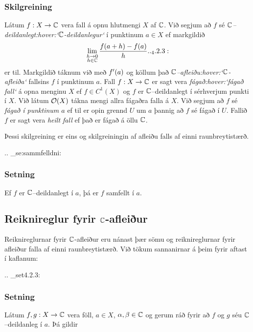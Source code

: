 \subsubsection{Skilgreining}
Látum $f:X\to {\mathbb C}$ vera fall á opnu hlutmengi $X$ af ${\mathbb C}$.  
Við segjum
að $f$ sé {\it ${\mathbb C}$--deildanlegt:hover:`${\mathbb C}$-deildanlegur`} í punktinum $a\in X$ ef markgildið
 \begin{equation*}\lim _{\substack{ h\to 0\\ h\in\C}}
 \dfrac{f(a+h)-f(a)}h  

.. _4.2.3:

 \end{equation*}
er til.  Markgildið táknum við með $f{\sp{\prime}}(a)$ og köllum það
{\it ${\mathbb C}$--afleiðu:hover:`${\mathbb C}$-afleiða`} fallsins $f$ í punktinum $a$.  
Fall $f:X\to {\mathbb C}$ er sagt vera {\it fágað:hover:`fágað fall`} á opna menginu $X$ ef $f\in
C^1(X)$ og $f$ er ${\mathbb C}$--deildanlegt í sérhverjum punkti í $X$.  Við
látum ${\cal O}(X)$ tákna mengi allra fágaðra falla á $X$.  Við segjum að
$f$ sé {\it fágað í punktinum $a$} ef til er opin grennd $U$ um $a$ þannig
að $f$ sé fágað í $U$.  Fallið $f$ er sagt vera {\it heilt fall} ef
það er fágað á  öllu ${\mathbb C}$.



Þessi skilgreining er eins og skilgreiningin af afleiðu falls af einni
raun\-breyti\-stærð.  



.. _se:sammfelldni:

\subsubsection{Setning}  Ef $f$ er ${\mathbb C}$--deildanlegt í $a$, þá er $f$ samfellt í $a$.




\subsection*{Reiknireglur fyrir ${\mathbb C}$-afleiður}

Reiknireglurnar fyrir ${\mathbb C}$-afleiður eru nánast þær sömu og
reiknireglurnar fyrir afleiður falla af einni raunbreytistærð.
Við tökum sannanirnar á þeim fyrir aftast í kaflanum:



.. _set4.2.3:

\subsubsection{Setning}
Látum $f,g:X\to {\mathbb C}$ vera föll, $a\in X$, $\alpha,\beta\in {\mathbb C}$ og
gerum ráð fyrir að $f$ og $g$ séu ${\mathbb C}$--deildanleg í $a$.  
Þá gildir

